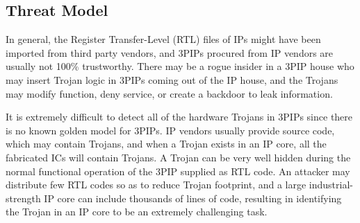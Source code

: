 \documentclass[10pt,journal]{IEEEtran}
\begin{document}

\subsection{Threat Model}



In general, the Register Transfer-Level (RTL) files of IPs might have been imported from third party vendors, and 3PIPs procured from IP vendors are usually not 100\% trustworthy. There may be a rogue insider in a 3PIP house who may insert Trojan logic in 3PIPs coming out of the IP house, and the Trojans may modify function, deny service, or create a backdoor to leak information.%



It is extremely difficult to detect all of the hardware Trojans in 3PIPs since there is no known golden model for 3PIPs. IP vendors usually provide source code, which may contain Trojans, and when a Trojan exists in an IP core, all the fabricated ICs will contain Trojans. A Trojan can be very well hidden during the normal functional operation of the 3PIP supplied as RTL code. An attacker may distribute few RTL codes so as to reduce Trojan footprint, and a large industrial-strength IP core can include thousands of lines of code, resulting in identifying the Trojan in an IP core to be an extremely challenging task.




\end{document}
